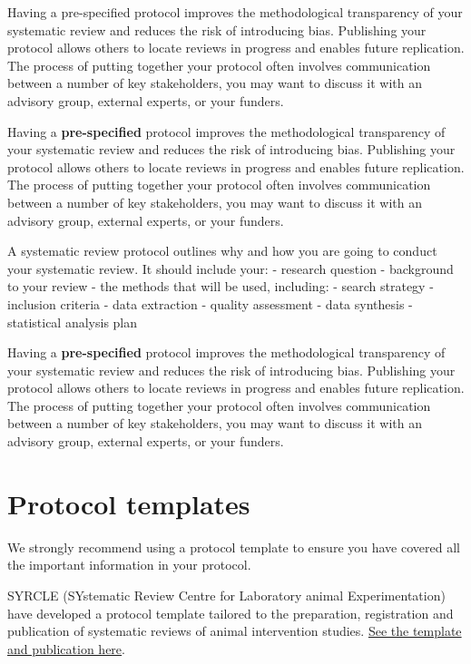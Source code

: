 \documentclass[
]{book}
\begin{document}
Having a pre-specified protocol improves the methodological transparency of your systematic review and reduces the risk of introducing bias. Publishing your protocol allows others to locate reviews in progress and enables future replication. The process of putting together your protocol often involves communication between a number of key stakeholders, you may want to discuss it with an advisory group, external experts, or your funders.

Having a \textbf{pre-specified} protocol improves the methodological transparency of your systematic review and reduces the risk of introducing bias. Publishing your protocol allows others to locate reviews in progress and enables future replication. The process of putting together your protocol often involves communication between a number of key stakeholders, you may want to discuss it with an advisory group, external experts, or your funders.

A systematic review protocol outlines why and how you are going to conduct your systematic review. It should include your:
- research question
- background to your review
- the methods that will be used, including:
- search strategy
- inclusion criteria
- data extraction
- quality assessment
- data synthesis
- statistical analysis plan

Having a \textbf{pre-specified} protocol improves the methodological transparency of your systematic review and reduces the risk of introducing bias. Publishing your protocol allows others to locate reviews in progress and enables future replication. The process of putting together your protocol often involves communication between a number of key stakeholders, you may want to discuss it with an advisory group, external experts, or your funders.

\hypertarget{protocol-templates}{%
\section{Protocol templates}\label{protocol-templates}}

We strongly recommend using a protocol template to ensure you have covered all the important information in your protocol.

SYRCLE (SYstematic Review Centre for Laboratory animal Experimentation) have developed a protocol template tailored to the preparation, registration and publication of systematic reviews of animal intervention studies. \href{https://onlinelibrary.wiley.com/doi/epdf/10.1002/ebm2.7}{See the template and publication here}.
\end{document}
